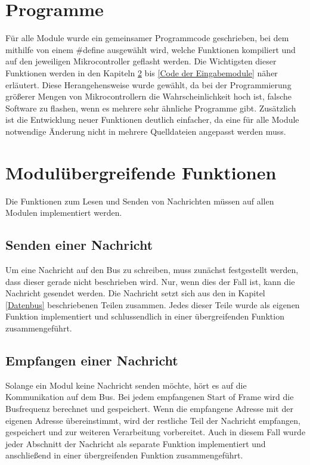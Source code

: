 \section{Programme}
Für alle Module wurde ein gemeinsamer Programmcode geschrieben, bei dem mithilfe von einem \#define ausgewählt wird, welche Funktionen kompiliert und auf den jeweiligen Mikrocontroller geflasht werden. Die Wichtigsten dieser Funktionen werden in den Kapiteln \ref{Modulübergreifende Funktionen} bis \ref{Code der Eingabemodule} näher erläutert. Diese Herangehensweise wurde gewählt, da bei der Programmierung größerer Mengen von Mikrocontrollern die Wahrscheinlichkeit hoch ist, falsche Software zu flashen, wenn es mehrere sehr ähnliche Programme gibt. Zusätzlich ist die Entwicklung neuer Funktionen deutlich einfacher, da eine für alle Module notwendige Änderung nicht in mehrere Quelldateien angepasst werden muss.

\section{Modulübergreifende Funktionen}
\label{Modulübergreifende Funktionen}
Die Funktionen zum Lesen und Senden von Nachrichten müssen auf allen Modulen implementiert werden.

\subsection{Senden einer Nachricht}
Um eine Nachricht auf den Bus zu schreiben, muss zunächst festgestellt werden, dass dieser gerade nicht beschrieben wird. Nur, wenn dies der Fall ist, kann die Nachricht gesendet werden.	Die Nachricht setzt sich aus den in Kapitel \ref{Datenbus} beschriebenen Teilen zusammen. Jedes dieser Teile wurde als eigenen Funktion implementiert und schlussendlich in einer übergreifenden Funktion zusammengeführt.




\subsection{Empfangen einer Nachricht}
Solange ein Modul keine Nachricht senden möchte, hört es auf die Kommunikation auf dem Bus. Bei jedem empfangenen Start of Frame wird die Busfrequenz berechnet und gespeichert. Wenn die empfangene Adresse mit der eigenen Adresse übereinstimmt, wird der restliche Teil der Nachricht empfangen, gespeichert und zur weiteren Verarbeitung vorbereitet. Auch in diesem Fall wurde jeder Abschnitt der Nachricht als separate Funktion implementiert und anschließend in einer übergreifenden Funktion zusammengeführt.\\

